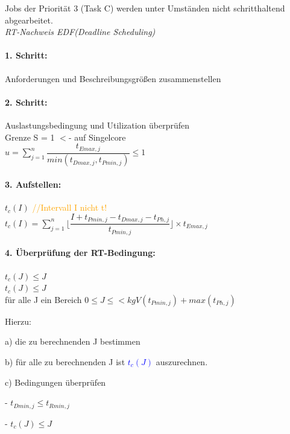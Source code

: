 \documentclass[12pt,a4paper,oneside,ngerman]{article}
\begin{document}
Jobs der Priorität 3 (Task C) werden unter Umständen nicht schritthaltend abgearbeitet.\\

\emph{RT-Nachweis EDF(Deadline Scheduling)}\\
\paragraph{1. Schritt:} Anforderungen und Beschreibungsgrößen zusammenstellen\\
\paragraph{2. Schritt:} Auslastungsbedingung und Utilization überprüfen\\
Grenze S = 1 $<$- auf Singelcore\\
\(u = \displaystyle\sum_{j=1}^n \dfrac{t_{Emax,j}}{ min(t_{Dmax,j}, t_{Pmin,j})} \leq 1\) \\
\paragraph{3. Aufstellen:} \(t_c(I)\) \textcolor{orange}{//Intervall I nicht t!} \\

\( t_c(I) = \displaystyle\sum_{j=1}^n \Big\lfloor \dfrac{I + t_{Pmin,j} - t_{Dmax,j} - t_{Ph,j} }{ t_{Pmin,j} } \Big\rfloor \times t_{Emax,j} \) \\

\paragraph{4. Überprüfung der RT-Bedingung:} \(t_{c}(J) \leq J\) \\
\(t_{c}(J) \leq J\)\\
für alle J ein Bereich
\(0 \leq J \leq < kgV(t_{Pmin,j}) + max(t_{Ph,j}) \)

Hierzu: 
\begin{description}
	\item a) die zu berechnenden J bestimmen
	\item b) für alle zu berechnenden J ist \textcolor{blue}{\(t_{c}(J)\)} auszurechnen.
	\item c) Bedingungen überprüfen
	\begin{description}
		\item - \( t_{Dmin,j} \leq t_{Rmin,j} \)
		\item - \( t_{c}(J) \leq J \)
	\end{description}
\end{description}
\end{document}
